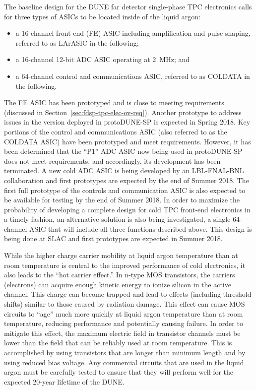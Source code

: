 The baseline design for the DUNE far detector single-phase TPC electronics calls for three types of ASICs to be located inside of the liquid argon:
\begin{itemize}
\item{a 16-channel front-end (FE) ASIC including amplification and pulse shaping, referred to as LArASIC in the following;}
\item{a 16-channel 12-bit ADC ASIC operating at 2~MHz; and}
\item{a 64-channel control and communications ASIC, referred to as COLDATA in the following.}
\end{itemize}
The FE ASIC has been prototyped and is close to meeting requirements (discussed in Section~\ref{sec:fdsp-tpc-elec-ov-req}). Another prototype to address issues in the version deployed in protoDUNE-SP is expected in Spring 2018. Key portions of the control and communications ASIC (also referred to as the COLDATA ASIC) have been prototyped and meet requirements.  However, it has been determined that the ``P1'' ADC ASIC now being used in protoDUNE-SP does not meet requirements, and accordingly, its development has been terminated.  A new cold ADC ASIC is being developed by an LBL-FNAL-BNL collaboration and first prototypes are expected by the end of Summer 2018.  The first full prototype of the controls and communication ASIC is also expected to be available for testing by the end of Summer 2018.  In order to maximize the probability of developing a complete design for cold TPC front-end electronics in a timely fashion, an alternative solution is also being investigated, a single 64-channel ASIC that will include all three functions described above.  This design is being done at SLAC and first prototypes are expected in Summer 2018.

While the higher charge carrier mobility at liquid argon temperature than at room temperature is central to the improved performance of cold electronics, it also leads to the ``hot carrier effect.''  In n-type MOS transistors, the carriers (electrons) can acquire enough kinetic energy to ionize silicon in the active channel.  This charge can become trapped and lead to effects (including threshold shifts) similar to those caused by radiation damage.  This effect can cause MOS circuits to ``age'' much more quickly at liquid argon temperature than at room temperature, reducing performance and potentially causing failure.  In order to mitigate this effect, the maximum electric field in transistor channels must be lower than the field that can be reliably used at room temperature.  This is accomplished by using transistors that are longer than minimum length and by using reduced bias voltage.  Any commercial circuits that are used in the liquid argon must be carefully tested to ensure that they will perform well for the expected 20-year lifetime of the DUNE.

